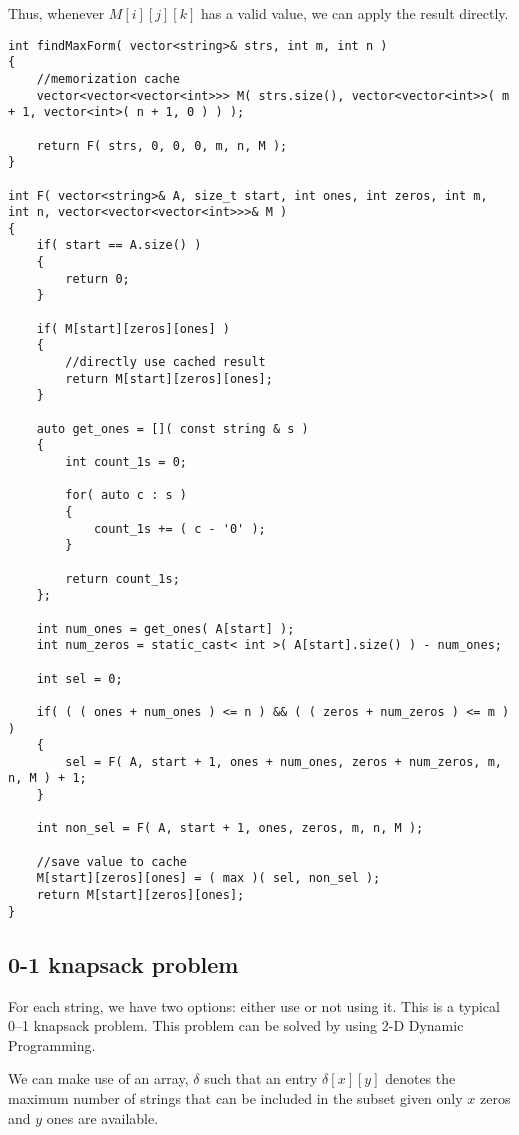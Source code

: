 Thus, whenever $M[i][j][k]$ has a valid value, we can apply the result directly.

\begin{lstlisting}[style=customc, caption={Backtracking With Memorization}]
int findMaxForm( vector<string>& strs, int m, int n )
{
    //memorization cache
    vector<vector<vector<int>>> M( strs.size(), vector<vector<int>>( m + 1, vector<int>( n + 1, 0 ) ) );

    return F( strs, 0, 0, 0, m, n, M );
}

int F( vector<string>& A, size_t start, int ones, int zeros, int m, int n, vector<vector<vector<int>>>& M )
{
    if( start == A.size() )
    {
        return 0;
    }

    if( M[start][zeros][ones] )
    {
        //directly use cached result
        return M[start][zeros][ones];
    }

    auto get_ones = []( const string & s )
    {
        int count_1s = 0;

        for( auto c : s )
        {
            count_1s += ( c - '0' );
        }

        return count_1s;
    };

    int num_ones = get_ones( A[start] );
    int num_zeros = static_cast< int >( A[start].size() ) - num_ones;

    int sel = 0;

    if( ( ( ones + num_ones ) <= n ) && ( ( zeros + num_zeros ) <= m ) )
    {
        sel = F( A, start + 1, ones + num_ones, zeros + num_zeros, m, n, M ) + 1;
    }

    int non_sel = F( A, start + 1, ones, zeros, m, n, M );

    //save value to cache
    M[start][zeros][ones] = ( max )( sel, non_sel );
    return M[start][zeros][ones];
}
\end{lstlisting}

\subsection{0-1 knapsack problem}
For each string, we have two options: either use or not using it. This is a typical 0--1 knapsack problem. This problem can be solved by using 2-D Dynamic Programming. 

We can make use of an array, $\delta$ such that an entry $\delta[x][y]$ denotes the maximum number of strings that can be included in the subset given only $x$ zeros and $y$ ones are available.


